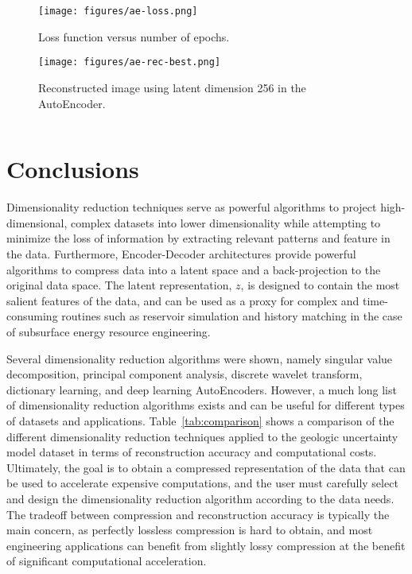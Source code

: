 \documentclass[a4paper,fleqn,12pt]{article}
\begin{document}
\begin{figure}[H]
    \centering
    \texttt{[image: figures/ae-loss.png]}
    \caption{Loss function versus number of epochs.}
    \label{fig:ae-loss}
\end{figure}

\begin{figure}[H]
    \centering
    \texttt{[image: figures/ae-rec-best.png]}
    \caption{Reconstructed image using latent dimension 256 in the AutoEncoder.}
    \label{fig:ae-rec-best}
\end{figure}

\inputminted[frame=lines, framesep=2mm, baselinestretch=1.2, 
             bgcolor=LightGray, fontsize=\footnotesize, linenos]
{python}{codes/ae.py}

\pagebreak
\section*{Conclusions}
Dimensionality reduction techniques serve as powerful algorithms to project high-dimensional, complex datasets into lower dimensionality while attempting to minimize the loss of information by extracting relevant patterns and feature in the data. Furthermore, Encoder-Decoder architectures provide powerful algorithms to compress data into a latent space and a back-projection to the original data space. The latent representation, $z$, is designed to contain the most salient features of the data, and can be used as a proxy for complex and time-consuming routines such as reservoir simulation and history matching in the case of subsurface energy resource engineering.

Several dimensionality reduction algorithms were shown, namely singular value decomposition, principal component analysis, discrete wavelet transform, dictionary learning, and deep learning AutoEncoders. However, a much long list of dimensionality reduction algorithms exists and can be useful for different types of datasets and applications. Table~\ref{tab:comparison} shows a comparison of the different dimensionality reduction techniques applied to the geologic uncertainty model dataset in terms of reconstruction accuracy and computational costs. Ultimately, the goal is to obtain a compressed representation of the data that can be used to accelerate expensive computations, and the user must carefully select and design the dimensionality reduction algorithm according to the data needs. The tradeoff between compression and reconstruction accuracy is typically the main concern, as perfectly lossless compression is hard to obtain, and most engineering applications can benefit from slightly lossy compression at the benefit of significant computational acceleration.
\end{document}
